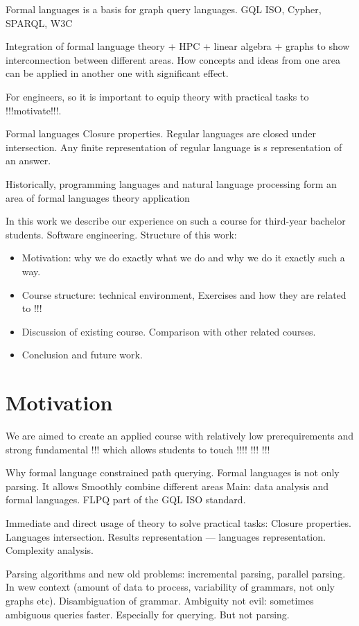 \documentclass[sigconf]{acmart}
\begin{document}
Formal languages is a basis for graph query languages. 
GQL ISO, Cypher, SPARQL, W3C 

Integration of formal language theory + HPC + linear algebra + graphs to show interconnection between different areas.
How concepts and ideas from one area can be applied in another one with significant effect. 

For engineers, so it is important to equip theory with practical tasks to !!!motivate!!!. 

Formal languages Closure properties. Regular languages are closed under intersection. Any finite representation of regular language is s representation of an answer.

Historically, programming languages and natural language processing form an area of formal languages theory application 

In this work we describe our experience on such a course for third-year bachelor students.
Software engineering.
Structure of this work:
\begin{itemize}
  \item Motivation: why we do exactly what we do and why we do it exactly such a way. 
  \item Course structure: technical environment, Exercises and how they are related to !!!
  \item Discussion of existing course. Comparison with other related courses.
  \item Conclusion and future work.
\end{itemize}  

\section{Motivation}

We are aimed to create an applied course with relatively low prerequirements and strong fundamental !!! which allows students to touch !!!! !!! !!!

Why formal language constrained path querying. 
Formal languages is not only parsing. 
It allows Smoothly combine different areas 
Main: data analysis and formal languages.
FLPQ part of the GQL ISO standard.

Immediate and direct usage of theory to solve practical tasks: Closure properties.
Languages intersection.
Results representation --- languages representation.
Complexity analysis.

Parsing algorithms and new old problems: incremental parsing, parallel parsing. In wew context (amount of data to process, variability of grammars, not only graphs etc).
Disambiguation of grammar.
Ambiguity not evil: sometimes ambiguous queries faster.
Especially for querying.
But not parsing.
\end{document}
